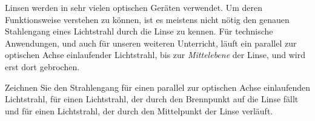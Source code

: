 \documentclass[paper=a4,twoside=true,,DIV13,BCOR1cm]{scrartcl}
\begin{document}
\begin{center}
\end{center}


Linsen werden in sehr vielen optischen Geräten verwendet. Um deren Funktionsweise verstehen zu können, ist es meistens nicht
nötig den genauen Stahlengang eines Lichtstrahl durch die Linse zu kennen. Für technische Anwendungen, und auch für unseren weiteren
Unterricht, läuft ein parallel zur optischen Achse einlaufender Lichtstrahl, bis zur \emph{Mittelebene} der Linse, und wird erst dort gebrochen.

\begin{aufgabe}
	Zeichnen Sie den Strahlengang für einen parallel zur optischen Achse einlaufenden Lichtstrahl, für einen Lichtstrahl, der durch
	den Brennpunkt auf die Linse fällt und für einen Lichtstrahl, der durch den Mittelpunkt der Linse verläuft.
\end{aufgabe}

\begin{center}
\end{center}
\end{document}
